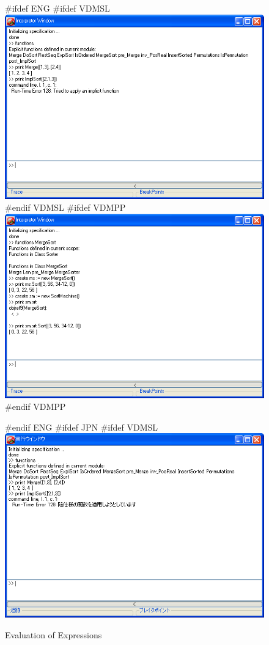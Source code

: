 \documentclass[\pformat,12pt]{article}
\begin{document}
\begin{figure}[tbh]
\begin{center}
\mbox{}
#ifdef ENG
#ifdef VDMSL
\includegraphics[width=15cm]{evalExpr-slENG.png}
#endif VDMSL
#ifdef VDMPP
\includegraphics[width=15cm]{evalExpr-ppENG.png}
#endif VDMPP
\caption{Evaluation of Expressions}
#endif ENG
#ifdef JPN
#ifdef VDMSL
\includegraphics[width=15cm]{evalExpr-sl.png}

\end{center}
\end{figure}
\end{document}
